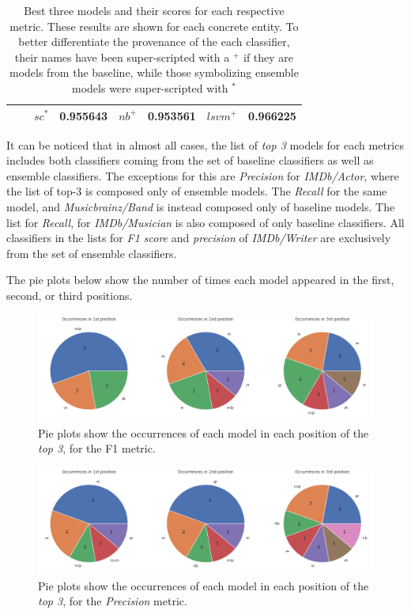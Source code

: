 \documentclass[epsfig,a4paper,11pt,titlepage,twoside,openany]{book}
\begin{document}
\begin{table}[H]
\begin{tabular}{|l|l|ll|ll|ll|}
                             &                           & $sc^*$    & 0.955643 & $nb^+$    & 0.953561  & $lsvm^+$                 & 0.966225    \\ \hline
\end{tabular}
\caption{Best three models and their scores for each respective metric. These results are shown for each concrete entity. To better differentiate the provenance of the each classifier, their names have been super-scripted with a $^+$ if they are models from the baseline, while those symbolizing ensemble models were super-scripted with $^*$}
\label{tab:comparison-bl-ens-top-3}
\end{table}


It can be noticed that in almost all cases, the list of \textit{top 3} models for each metrics includes both classifiers coming from the set of baseline classifiers as well as ensemble classifiers. The exceptions for this are \textit{Precision} for \textit{IMDb/Actor}, where the list of top-3 is composed only of ensemble models. The \textit{Recall} for the same model, and \textit{Musicbrainz/Band} is instead composed only of baseline models. The list for \textit{Recall}, for \textit{IMDb/Musician} is also composed of only baseline classifiers. All classifiers in the lists for \textit{F1 score} and \textit{precision} of \textit{IMDb/Writer} are exclusively from the set of ensemble classifiers.

The pie plots below show the number of times each model appeared in the first, second, or third positions. 

\begin{figure}[H]
  \centering \includegraphics[width=\textwidth]{comparison_f1_top_spaces_pies} 
  \caption{Pie plots show the occurrences of each model in each position of the \textit{top 3}, for the F1 metric.}
  \label{fig:comparison-pie-occurrences-f1}
\end{figure}

\begin{figure}[H]
  \centering \includegraphics[width=\textwidth]{comparison_prec_top_spaces_pies} 
  \caption{Pie plots show the occurrences of each model in each position of the \textit{top 3}, for the \textit{Precision} metric.}
  \label{fig:comparison-pie-occurrences-precision}
\end{figure}
\end{document}
